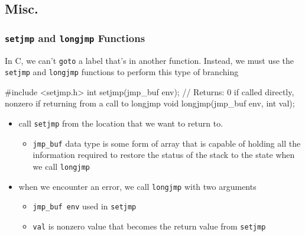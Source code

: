 \documentclass[newPxFont,sthlmFooter,nooffset]{beamer}
\begin{document}
\subsection{Misc.}

\begin{frame}[containsverbatim,t]
  \frametitle{\texttt{setjmp} and \texttt{longjmp} Functions}
In C, we can't \texttt{goto} a label that's in another function. Instead, we must use the \texttt{setjmp} and \texttt{longjmp} functions to perform this type of branching
\begin{codedef}
 #include <setjmp.h>
int setjmp(jmp_buf env);
// Returns: 0 if called directly, nonzero if returning from a call to longjmp
void longjmp(jmp_buf env, int val);
\end{codedef}
\begin{itemize}
\item call \texttt{setjmp} from the location that we want to return to.
  \begin{itemize}
  \item \texttt{jmp\_buf} data type is some form of array that is capable of holding all the information required to restore the status of the stack to the state when we call \texttt{longjmp}
  \end{itemize}
\item when we encounter an error, we call \texttt{longjmp} with two arguments
  \begin{itemize}
  \item \texttt{jmp\_buf env} used in \texttt{setjmp}
  \item \texttt{val} is nonzero value that becomes the return value from \texttt{setjmp}
  \end{itemize}
\end{itemize}
\end{frame}

\begin{comment}
\subsection{Last Words}

\begin{frame}
  \frametitle{Last Words}
  \begin{itemize}
  \item read chapter 8
  \end{itemize}
\end{frame}
\end{comment}
\end{document}
